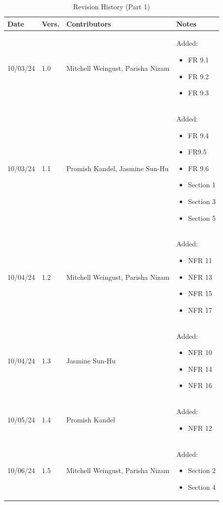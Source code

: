 \documentclass[12pt]{article}
\begin{document}
\begin{table}[H]
  \centering
  \caption{Revision History (Part 1)}
  \label{TblRevisionHistoryPart1}
  \begin{tabularx}{\textwidth}{p{1.5cm} p{1cm} p{3.5cm} X}
      \toprule
      \textbf{Date} & \textbf{Vers.} & \textbf{Contributors} & \textbf{Notes} \\
      \midrule
      10/03/24 & 1.0 & Mitchell Weingust, Parisha Nizam & Added:
      \begin{itemize}[leftmargin=*]
        \item FR 9.1
        \item FR 9.2
        \item FR 9.3
      \end{itemize} \\
      10/03/24 & 1.1 & Promish Kandel, Jasmine Sun-Hu & Added:
      \begin{itemize}[leftmargin=*]
        \item FR 9.4
        \item FR9.5
        \item FR 9.6
        \item Section 1
        \item Section 3
        \item Section 5
      \end{itemize} \\
      10/04/24 & 1.2 & Mitchell Weingust, Parisha Nizam & Added:
      \begin{itemize}[leftmargin=*]
        \item NFR 11
        \item NFR 13
        \item NFR 15
        \item NFR 17
      \end{itemize} \\
      10/04/24 & 1.3 & Jasmine Sun-Hu & Added:
      \begin{itemize}[leftmargin=*]
        \item NFR 10
        \item NFR 14
        \item NFR 16
      \end{itemize} \\
      10/05/24 & 1.4 & Promish Kandel & Added:
      \begin{itemize}[leftmargin=*]
        \item NFR 12
      \end{itemize} \\
      10/06/24 & 1.5 & Mitchell Weingust, Parisha Nizam & Added:
      \begin{itemize}[leftmargin=*]
        \item Section 2
        \item Section 4
      \end{itemize} \\
    \end{tabularx}
  \end{table}
\end{document}
